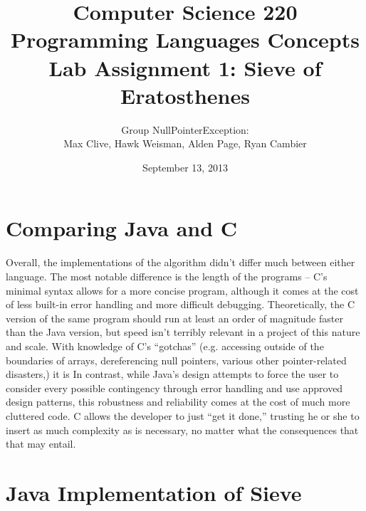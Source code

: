 \documentclass[a4paper,11pt]{article}
\title{Computer Science 220 \\[20pt]
Programming Languages Concepts\\ [20pt]
\textbf{Lab Assignment 1: Sieve of Eratosthenes}}
\author{Group NullPointerException: \\ Max Clive, Hawk Weisman, Alden Page, Ryan Cambier}
\date{September 13, 2013 }
\begin{document}
\maketitle

\section{Comparing Java and C}

	Overall, the implementations of the algorithm didn't differ much between either language. The most notable difference is the length of the programs – C's minimal syntax allows for a more concise program, although it comes at the cost of less built-in error handling and more difficult debugging. Theoretically, the C version of the same program should run at least an order of magnitude faster than the Java version, but speed isn't terribly relevant in a project of this nature and scale.
	With knowledge of C's “gotchas” (e.g. accessing outside of the boundaries of arrays, dereferencing null pointers, various other pointer-related disasters,) it is 
	In contrast, while Java's design attempts to force the user to consider every possible contingency through error handling and use approved design patterns, this robustness and reliability comes at the cost of much more cluttered code. C allows the developer to just “get it done,” trusting he or she to insert as much complexity as is necessary, no matter what the consequences that that may entail.

\section{Java Implementation of Sieve}
\end{document}

